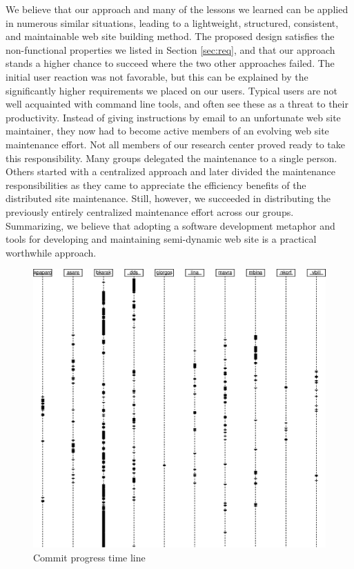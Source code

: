 \documentclass[10pt]{article}
\begin{document}
We believe that our approach and many of the lessons we learned
can be applied in numerous similar situations,
leading to a lightweight, structured, consistent, and maintainable
web site building method. The proposed design satisfies the non-functional properties
we listed in Section \ref{sec:req},
and that our approach stands a higher chance to succeed where the
two other approaches failed.
The initial user reaction was not favorable, but this can
be explained by the significantly higher requirements we
placed on our users. Typical users are not well acquainted
with command line tools, and often see these as a threat to their productivity.
Instead of giving instructions by email to an unfortunate
web site maintainer, they now had to become active members
of an evolving web site maintenance effort.
Not all members of our research center proved ready to take
this responsibility.
Many groups delegated the maintenance to a single person. 
Others started with a centralized approach and later divided the
maintenance responsibilities as they came to appreciate the efficiency
benefits of the distributed site maintenance.
Still, however, we succeeded in distributing the previously
entirely centralized maintenance effort across our groups.
Summarizing, we believe that adopting a software development
metaphor and tools for developing and maintaining semi-dynamic
web site is a practical worthwhile approach.

\begin{figure}[h!]
\includegraphics[scale=0.6]{cvs-log.eps}
\caption{Commit progress time line}
\label{fig:cvs-log}
\end{figure}
\end{document}
